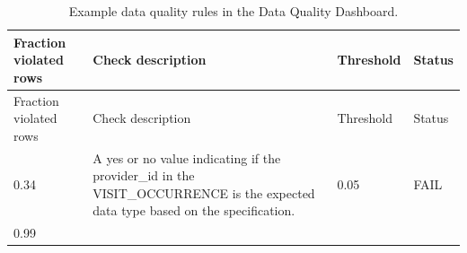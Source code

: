 \documentclass[11pt]{book}
\theoremstyle{definition}
\theoremstyle{definition}
\theoremstyle{definition}
\theoremstyle{remark}
\begin{document}
\begin{longtable}[]{@{}llll@{}}
\caption{\label{tab:dqdExamples} Example data quality rules in the Data
Quality Dashboard.}\tabularnewline
\toprule
\begin{minipage}[b]{0.12\columnwidth}\raggedright\strut
Fraction violated rows\strut
\end{minipage} & \begin{minipage}[b]{0.47\columnwidth}\raggedright\strut
Check description\strut
\end{minipage} & \begin{minipage}[b]{0.10\columnwidth}\raggedright\strut
Threshold\strut
\end{minipage} & \begin{minipage}[b]{0.07\columnwidth}\raggedright\strut
Status\strut
\end{minipage}\tabularnewline
\midrule
\endfirsthead
\toprule
\begin{minipage}[b]{0.12\columnwidth}\raggedright\strut
Fraction violated rows\strut
\end{minipage} & \begin{minipage}[b]{0.47\columnwidth}\raggedright\strut
Check description\strut
\end{minipage} & \begin{minipage}[b]{0.10\columnwidth}\raggedright\strut
Threshold\strut
\end{minipage} & \begin{minipage}[b]{0.07\columnwidth}\raggedright\strut
Status\strut
\end{minipage}\tabularnewline
\midrule
\endhead
\begin{minipage}[t]{0.12\columnwidth}\raggedright\strut
0.34\strut
\end{minipage} & \begin{minipage}[t]{0.47\columnwidth}\raggedright\strut
A yes or no value indicating if the provider\_id in the
VISIT\_OCCURRENCE is the expected data type based on the
specification.\strut
\end{minipage} & \begin{minipage}[t]{0.10\columnwidth}\raggedright\strut
0.05\strut
\end{minipage} & \begin{minipage}[t]{0.07\columnwidth}\raggedright\strut
FAIL\strut
\end{minipage}\tabularnewline
\begin{minipage}[t]{0.12\columnwidth}\raggedright\strut
0.99\strut
\end{minipage} & \begin{minipage}[t]{0.47\columnwidth}\raggedright\strut

\end{minipage}
\end{longtable}
\end{document}
